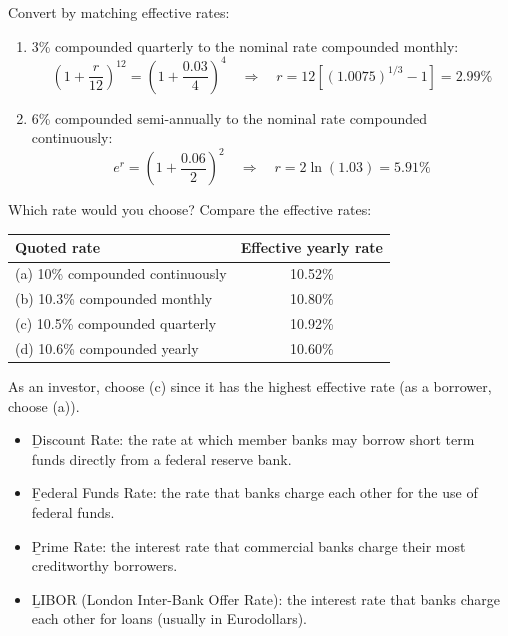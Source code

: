 \begin{example}
    Convert by matching effective rates:
    \begin{enumerate}[label=(\alph*)]
        \item 3\% compounded quarterly to the nominal rate compounded monthly:
        \[\left(1+\frac{r}{12}\right)^{12} = \left(1+\frac{0.03}{4}\right)^{4} \quad \Rightarrow \quad r = 12\left[(1.0075)^{1/3} - 1\right] = 2.99\%\]
        \item 6\% compounded semi-annually to the nominal rate compounded continuously:
        \[e^{r} = \left(1+\frac{0.06}{2}\right)^{2} \quad \Rightarrow \quad r = 2\ln(1.03) = 5.91\%\]
    \end{enumerate}
\end{example}

\begin{example}
    Which rate would you choose? Compare the effective rates:
    \begin{center}
    \begin{tabular}{lc}
        \toprule
        Quoted rate & Effective yearly rate\\
        \midrule
        (a) 10\% compounded continuously & 10.52\%\\
        (b) 10.3\% compounded monthly & 10.80\%\\
        (c) 10.5\% compounded quarterly & 10.92\%\\
        (d) 10.6\% compounded yearly & 10.60\%\\
        \bottomrule
    \end{tabular}
    \end{center}
    As an investor, choose (c) since it has the highest effective rate (as a borrower, choose (a)).
\end{example}

\begin{itemize}
    \item \b{Discount Rate}: the rate at which member banks may borrow short term funds directly from a federal reserve bank.
    \item \b{Federal Funds Rate}: the rate that banks charge each other for the use of federal funds.
    \item \b{Prime Rate}: the interest rate that commercial banks charge their most creditworthy borrowers.
    \item \b{LIBOR} (London Inter-Bank Offer Rate): the interest rate that banks charge each other for loans (usually in Eurodollars).
\end{itemize}
